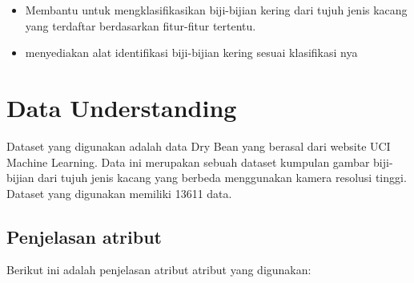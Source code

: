 \documentclass[
  letterpaper,
]{krantz}
\providecommand{\tightlist}{%
  \setlength{\itemsep}{0pt}\setlength{\parskip}{0pt}}\usepackage{longtable,booktabs,array}
\begin{document}
\begin{itemize}
\tightlist
\item
  Membantu untuk mengklasifikasikan biji-bijian kering dari tujuh jenis
  kacang yang terdaftar berdasarkan fitur-fitur tertentu.
\item
  menyediakan alat identifikasi biji-bijian kering sesuai klasifikasi
  nya
\end{itemize}

\hypertarget{data-understanding}{%
\section{Data Understanding}\label{data-understanding}}

Dataset yang digunakan adalah data Dry Bean yang berasal dari website
UCI Machine Learning. Data ini merupakan sebuah dataset kumpulan gambar
biji-bijian dari tujuh jenis kacang yang berbeda menggunakan kamera
resolusi tinggi. Dataset yang digunakan memiliki 13611 data.

\hypertarget{penjelasan-atribut}{%
\subsection{Penjelasan atribut}\label{penjelasan-atribut}}

Berikut ini adalah penjelasan atribut atribut yang digunakan:
\end{document}
